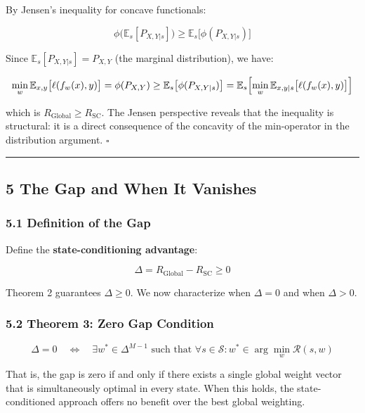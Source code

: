 \documentclass[
  12pt,
]{article}
\begin{document}
By Jensen's inequality for concave functionals:

\[\phi\bigl(\mathbb{E}_s[P_{X,Y|s}]\bigr) \geq \mathbb{E}_s\bigl[\phi(P_{X,Y|s})\bigr]\]

Since \(\mathbb{E}_s[P_{X,Y|s}] = P_{X,Y}\) (the marginal distribution),
we have:

\[\min_{w} \mathbb{E}_{x,y}\bigl[\ell(f_w(x), y)\bigr] = \phi(P_{X,Y}) \geq \mathbb{E}_s\bigl[\phi(P_{X,Y|s})\bigr] = \mathbb{E}_s\Bigl[\min_{w} \mathbb{E}_{x,y|s}\bigl[\ell(f_w(x), y)\bigr]\Bigr]\]

which is \(R_{\text{Global}} \geq R_{\text{SC}}\). The Jensen
perspective reveals that the inequality is structural: it is a direct
consequence of the concavity of the min-operator in the distribution
argument. \(\square\)

\begin{center}\rule{0.5\linewidth}{0.5pt}\end{center}

\subsection{5 The Gap and When It
Vanishes}\label{the-gap-and-when-it-vanishes}

\subsubsection{5.1 Definition of the Gap}\label{definition-of-the-gap}

Define the \textbf{state-conditioning advantage}:

\[\Delta = R_{\text{Global}} - R_{\text{SC}} \geq 0\]

Theorem 2 guarantees \(\Delta \geq 0\). We now characterize when
\(\Delta = 0\) and when \(\Delta > 0\).

\subsubsection{5.2 Theorem 3: Zero Gap
Condition}\label{theorem-3-zero-gap-condition}

\[\Delta = 0 \quad \Longleftrightarrow \quad \exists w^* \in \Delta^{M-1} \text{ such that } \forall s \in \mathcal{S}: w^* \in \arg\min_{w} \mathcal{R}(s, w)\]

That is, the gap is zero if and only if there exists a single global
weight vector that is simultaneously optimal in every state. When this
holds, the state-conditioned approach offers no benefit over the best
global weighting.
\end{document}
